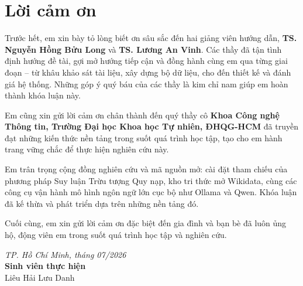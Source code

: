 \chapter*{Lời cảm ơn}
\label{thanks}

Trước hết, em xin bày tỏ lòng biết ơn sâu sắc đến hai giảng viên hướng dẫn, \textbf{TS. Nguyễn
Hồng Bửu Long} và \textbf{TS. Lương An Vinh}. Các thầy đã tận tình định hướng đề tài, gợi mở hướng
tiếp cận và đồng hành cùng em qua từng giai đoạn -- từ khâu khảo sát tài liệu, xây dựng bộ dữ liệu,
cho đến thiết kế và đánh giá hệ thống. Những góp ý quý báu của các thầy là kim chỉ nam giúp em hoàn
thành khóa luận này.

Em cũng xin gửi lời cảm ơn chân thành đến quý thầy cô \textbf{Khoa Công nghệ Thông tin, Trường Đại
học Khoa học Tự nhiên, ĐHQG-HCM} đã truyền đạt những kiến thức nền tảng trong suốt quá trình học
tập, tạo cho em hành trang vững chắc để thực hiện nghiên cứu này.

Em trân trọng cộng đồng nghiên cứu và mã nguồn mở: cài đặt tham chiếu của phương pháp Suy luận
Trừu tượng Quy nạp, kho tri thức mở Wikidata, cùng các công cụ vận hành mô hình ngôn ngữ lớn cục bộ
như Ollama và Qwen. Khóa luận đã kế thừa và phát triển dựa trên những nền tảng đó.

Cuối cùng, em xin gửi lời cảm ơn đặc biệt đến gia đình và bạn bè đã luôn ủng hộ, động viên em trong
suốt quá trình học tập và nghiên cứu.

\vspace{2cm}

\noindent\hfill
\begin{minipage}{0.45\textwidth}
\centering
\textit{TP. Hồ Chí Minh, tháng 07/2026}\\[1.5cm]
\textbf{Sinh viên thực hiện}\\[2cm]
Liêu Hải Lưu Danh
\end{minipage}